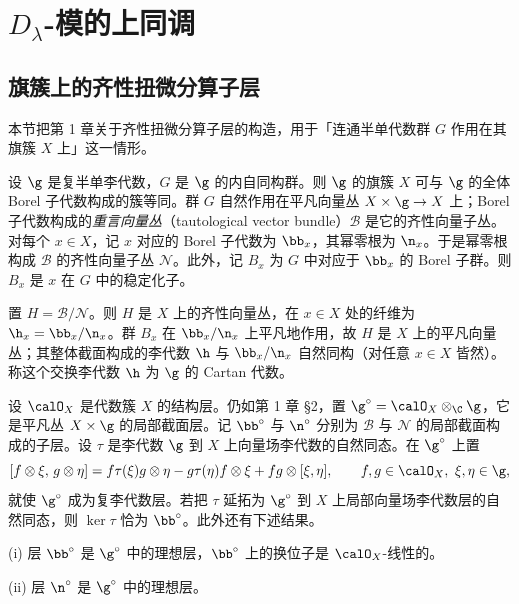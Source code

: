 \chapter{$D_\lambda$-模的上同调}
\label{ch:02.2}

\section{旗簇上的齐性扭微分算子层}
\label{sec:02.2.1}

本节把第 1 章关于齐性扭微分算子层的构造，用于「连通半单代数群 $G$ 作用在其旗簇 $X$ 上」这一情形。

设 $\g$ 是复半单李代数，$G$ 是 $\g$ 的内自同构群。则 $\g$ 的旗簇 $X$ 可与 $\g$ 的全体 Borel 子代数构成的簇等同。群 $G$ 自然作用在平凡向量丛 $X\times\g\to X$ 上；Borel 子代数构成的\emph{重言向量丛}（tautological vector bundle）$\mathcal{B}$ 是它的齐性向量子丛。对每个 $x\in X$，记 $x$ 对应的 Borel 子代数为 $\bb_x$，其幂零根为 $\n_x$。于是幂零根构成 $\mathcal{B}$ 的齐性向量子丛 $\mathcal{N}$。此外，记 $B_x$ 为 $G$ 中对应于 $\bb_x$ 的 Borel 子群。则 $B_x$ 是 $x$ 在 $G$ 中的稳定化子。

置 $H=\mathcal{B}/\mathcal{N}$。则 $H$ 是 $X$ 上的齐性向量丛，在 $x\in X$ 处的纤维为 $\h_x=\bb_x/\n_x$。群 $B_x$ 在 $\bb_x/\n_x$ 上平凡地作用，故 $H$ 是 $X$ 上的平凡向量丛；其整体截面构成的李代数 $\h$ 与 $\bb_x/\n_x$ 自然同构（对任意 $x\in X$ 皆然）。称这个交换李代数 $\h$ 为 $\g$ 的 Cartan 代数。

设 $\calO_X$ 是代数簇 $X$ 的结构层。仍如第 1 章 §2，置 $\g^\circ=\calO_X\otimes_\C\g$，它是平凡丛 $X\times\g$ 的局部截面层。记 $\bb^\circ$ 与 $\n^\circ$ 分别为 $\mathcal{B}$ 与 $\mathcal{N}$ 的局部截面构成的子层。设 $\tau$ 是李代数 $\g$ 到 $X$ 上向量场李代数的自然同态。在 $\g^\circ$ 上置
$$[f\otimes\xi,\,g\otimes\eta]=f\tau(\xi)g\otimes\eta-g\tau(\eta)f\otimes\xi+fg\otimes[\xi,\eta],\qquad f,g\in\calO_X,\ \xi,\eta\in\g,$$
就使 $\g^\circ$ 成为复李代数层。若把 $\tau$ 延拓为 $\g^\circ$ 到 $X$ 上局部向量场李代数层的自然同态，则 $\ker\tau$ 恰为 $\bb^\circ$。此外还有下述结果。

\begin{lemma}\label{lem:02.2.1.1}
(i) 层 $\bb^\circ$ 是 $\g^\circ$ 中的理想层，$\bb^\circ$ 上的换位子是 $\calO_X$-线性的。

(ii) 层 $\n^\circ$ 是 $\g^\circ$ 中的理想层。
\end{lemma}

